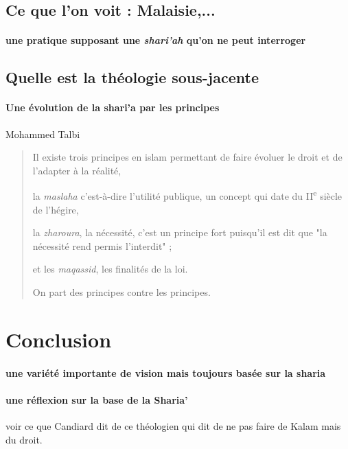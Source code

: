 \subsection{Ce que l'on voit : Malaisie,...} 

\paragraph{une pratique supposant une \textit{shari'ah} qu'on ne peut interroger}

\subsection{Quelle est la théologie sous-jacente}

\paragraph{Une évolution de la shari'a par les principes} Mohammed Talbi 
\begin{quote}
    Il existe
trois principes en islam permettant de faire évoluer le droit et de
l'adapter
à la réalité, 

la \emph{maslaha} c'est-à-dire l'utilité publique, un
concept qui date du II\textsuperscript{e} siècle de l'hégire, 

la
\emph{zharoura}, la nécessité, c'est un principe fort puisqu'il est dit
que "la nécessité rend permis l'interdit" ; 

et les \emph{maqassid}, les
finalités de la loi. 

\begin{Synthesis}
On part des principes contre les principes. 
\end{Synthesis}
\end{quote}


\section{Conclusion}

\paragraph{une variété importante de vision mais toujours basée sur la sharia}

\paragraph{une réflexion sur la base de la Sharia'}
voir ce que Candiard dit de ce théologien qui dit de ne pas faire de Kalam mais du droit.

